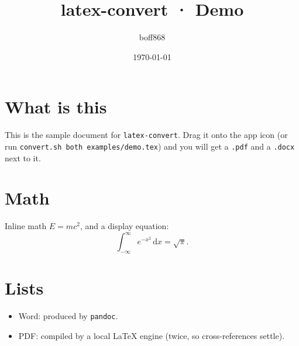 \documentclass[11pt]{article}
\title{latex-convert · Demo}
\author{boff868}
\date{\today}
\begin{document}
\maketitle

\section{What is this}
This is the sample document for \texttt{latex-convert}.
Drag it onto the app icon (or run \texttt{convert.sh both examples/demo.tex})
and you will get a \texttt{.pdf} and a \texttt{.docx} next to it.

\section{Math}
Inline math $E = mc^2$, and a display equation:
\begin{equation}
  \int_{-\infty}^{\infty} e^{-x^2}\,\mathrm{d}x = \sqrt{\pi}.
\end{equation}

\section{Lists}
\begin{itemize}
  \item Word: produced by \texttt{pandoc}.
  \item PDF: compiled by a local LaTeX engine (twice, so cross-references settle).
\end{itemize}
\end{document}
